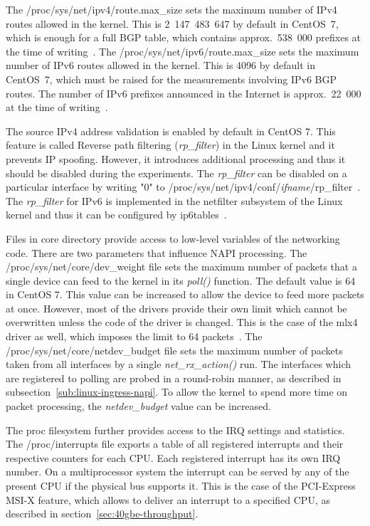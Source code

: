 The /proc/sys/net/ipv4/route.max\_size sets the maximum number of IPv4 routes allowed in the kernel.
This is 2~147~483~647 by default in CentOS~7, which is enough for a full BGP table,
which contains approx.~538~000 prefixes at the time of writing~\cite{bgp-analysis-reports}.
The /proc/sys/net/ipv6/route.max\_size sets the maximum number of IPv6 routes allowed in the kernel.
This is 4096 by default in CentOS~7, which must be raised for the measurements involving IPv6 BGP routes.
The number of IPv6 prefixes announced in the Internet is approx.~22~000 at the time of writing~\cite{bgp-analysis-reports}.

The source IPv4 address validation is enabled by default in CentOS 7.
This feature is called Reverse path filtering ({\it{rp\_filter}}) in the Linux kernel and it prevents IP spoofing.
However, it introduces additional processing and thus it should be disabled during the experiments.
The {\it{rp\_filter}} can be disabled on a particular interface
by writing "0" to /proc/sys/net/ipv4/conf/{\it{ifname}}/rp\_filter~\cite{kernel-doc-ip-sysctl}.
The {\it{rp\_filter}} for IPv6 is implemented in the netfilter subsystem of the Linux kernel and
thus it can be configured by ip6tables~\cite{kernel-source}.

Files in core directory provide access to low-level variables of the networking code.
There are two parameters that influence NAPI processing.
The /proc/sys/net/core/dev\_weight file sets the maximum number of packets that a single device
can feed to the kernel in its {\it{poll()}} function.
The default value is 64 in CentOS 7.
This value can be increased to allow the device to feed more packets at once.
However, most of the drivers provide their own limit which cannot be overwritten unless the code of the driver is changed.
This is the case of the mlx4 driver as well, which imposes the limit to 64 packets~\cite{kernel-source}.
The /proc/sys/net/core/netdev\_budget file sets the
maximum number of packets taken from all interfaces by a single {\it{net\_rx\_action()}} run.
The interfaces which are registered to polling are
probed in a round-robin manner, as described in subsection~\ref{sub:linux-ingress-napi}.
To allow the kernel to spend more time on packet processing, the {\it{netdev\_budget}} value can be increased.

The proc filesystem further provides access to the IRQ settings and statistics.
The /proc/interrupts file exports a table of all registered interrupts and their respective counters for each CPU.
Each registered interrupt has its own IRQ number.
On a multiprocessor system the interrupt can be served by any of the present CPU if the physical bus supports it.
This is the case of the PCI-Express MSI-X feature, which allows to deliver an interrupt to a specified CPU,
as described in section~\ref{sec:40gbe-throughput}.

